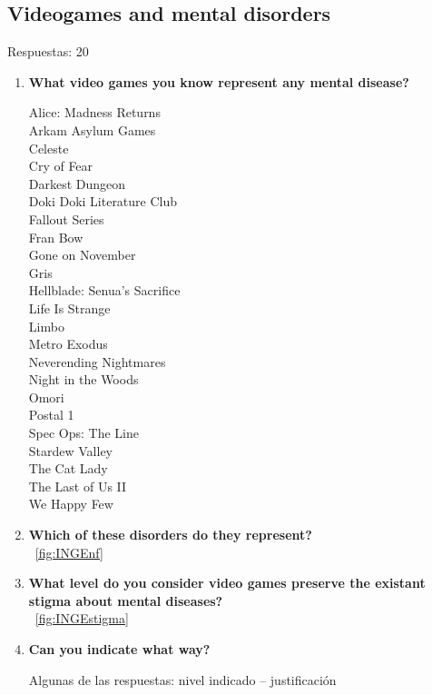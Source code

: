 \documentclass[12pt, a4paper,twoside,titlepage]{book}
\begin{document}
\subsection{Videogames and mental disorders}
Respuestas: 20
\begin{enumerate}[label=\textbf{\arabic*}.]
     \item \textbf{What video games you know represent any mental disease?}
     
    Alice: Madness Returns\\
    Arkam Asylum Games\\
    Celeste\\
    Cry of Fear\\
    Darkest Dungeon \\
    Doki Doki Literature Club\\
    Fallout Series\\
    Fran Bow\\
    Gone on November\\
    Gris\\
    Hellblade: Senua's Sacrifice\\
    Life Is Strange\\
    Limbo\\
    Metro Exodus\\
    Neverending Nightmares\\
    Night in the Woods\\
    Omori\\
    Postal 1\\
    Spec Ops: The Line\\
    Stardew Valley\\
    The Cat Lady\\
    The Last of Us II\\
    We Happy Few\\


     \item \textbf{Which of these disorders do they represent?}\\
    ~\ref{fig:INGEnf}
     \item \textbf{What level do you consider video games preserve the existant stigma about mental diseases?}\\
    ~\ref{fig:INGEstigma}
     \item \textbf{Can you indicate what way?}\\
     \label{estigmaIngles}
     
     Algunas de las respuestas: nivel indicado – justificación 


\end{enumerate}
\end{document}
